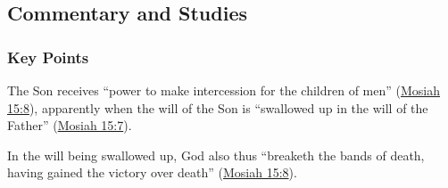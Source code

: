 	
	
\subsection{Commentary and Studies} %
	\label{INTERCESSION-COMMENTARY}

	\subsubsection{Key Points}
		\label{INTERCESSION-KEYS}
	
		\begin{compactitem}
			\item The Son receives ``power to make intercession for the children of men'' (\hyperref[MOSIAH-15-8]{Mosiah 15:8}), apparently when the will of the Son is ``swallowed up in the will of the Father'' (\hyperref[MOSIAH-15-7]{Mosiah 15:7}).
				\begin{compactitem}
					\item In the will being swallowed up, God also thus ``breaketh the bands of death, having gained the victory over death'' (\hyperref[MOSIAH-15-8]{Mosiah 15:8}).
				\end{compactitem}
		\end{compactitem}